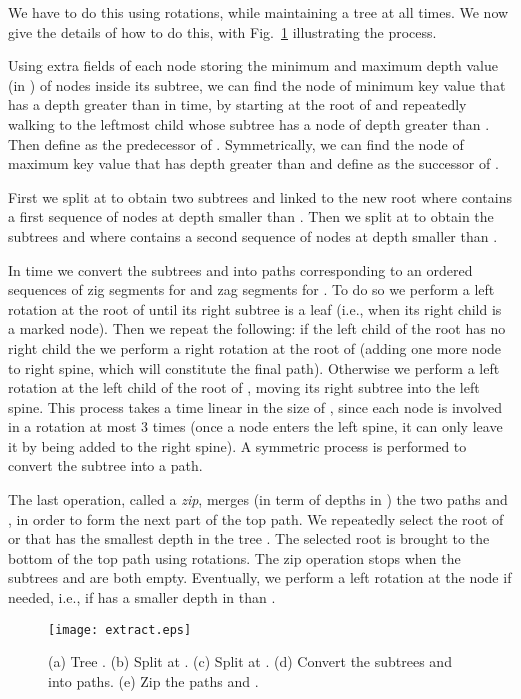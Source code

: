 \documentclass[letterpaper,11pt]{article}
\newcommand{\toppath}{top path}
\newcounter{todo}
\newcommand{\todo}[1]{}
\begin{document}
We have to do this using rotations, while maintaining a tree at all
times. We now give the details of how to do this, with
Fig.~\ref{fig-extract} illustrating the process.

Using extra fields of each node storing the minimum and maximum depth value
(in ) of nodes inside its subtree, we can find the node  of
minimum key value that has a depth greater than  in 
time, by starting at the root of  and repeatedly walking to the
leftmost child whose subtree has a node of depth greater than . Then
define  as the predecessor of . Symmetrically, we can find the
node  of maximum key value that has depth greater than  and define
 as the successor of .

First we \todo{Operation split should be introduced properly, with BST
formulation. Probably in tango section. Rolf.} split  at  to
obtain two subtrees  and  linked to the new root  where 
contains a first sequence of nodes at depth smaller than . Then we split
 at  to obtain the subtrees  and  where  contains a second
sequence of nodes at depth smaller than .

In  time we convert the subtrees  and  into paths
corresponding to an ordered sequences of zig segments for  and zag
segments for . To do so we perform a left rotation at the root of 
until its right subtree is a leaf (i.e., when its right child is a marked
node). Then we repeat the following: if the left child of the root has no
right child the we perform a right rotation at the root of  (adding one
more node to right spine, which will constitute the final path). Otherwise
we perform a left rotation at the left child of the root of , moving its
right subtree into the left spine. This process takes a time linear in the
size of , since each node is involved in a rotation at most 3 times
(once a node enters the left spine, it can only leave it by being added to
the right spine). A symmetric process is performed to convert the subtree
 into a path.

The last operation, called a \emph{zip}, merges (in term of depths in )
the two paths  and , in order to form the next part of the
\toppath. We repeatedly select the root of  or  that has the smallest
depth in the tree . The selected root is brought to the bottom of the
\toppath{} using  rotations. The zip operation stops when the subtrees
 and  are both empty. Eventually, we perform a left rotation at the
node  if needed, i.e., if  has a smaller depth in  than .

\begin{figure}\begin{center}
        \texttt{[image: extract.eps]}
    \end{center}
    \caption{\label{fig-extract} (a) Tree . (b) Split  at . (c) Split  at . (d) Convert the subtrees  and  into paths. (e) Zip the paths  and .}
\end{figure}
\end{document}
